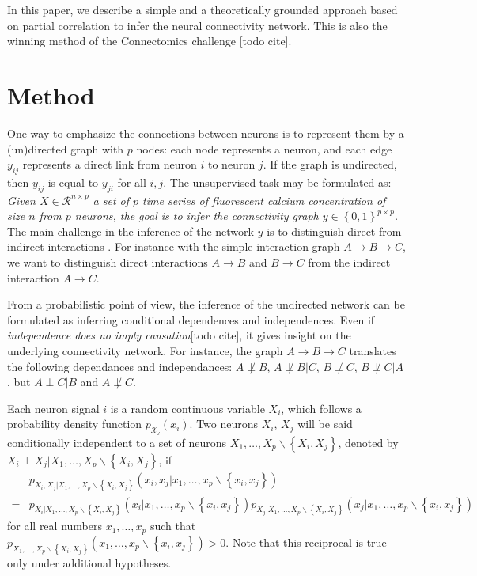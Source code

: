 \documentclass[wcp]{jmlr}
\begin{document}
In this paper, we describe a simple and a theoretically grounded approach
based on partial correlation to infer the neural connectivity network.
This is also the winning method of the Connectomics challenge [todo cite].

\section{Method}

One way to emphasize the connections between neurons is to represent them by a
(un)directed graph with $p$ nodes: each node represents a neuron, and each
edge $y_{ij}$ represents a direct link from neuron  $i$ to neuron $j$. If the
graph is undirected, then $y_{ij}$ is equal to $y_{ji}$  for all $i,j$.
The unsupervised task may be formulated as:
\textit{Given $X \in \mathcal{R}^{n \times p}$  a set of $p$ time series of
fluorescent calcium concentration of size $n$ from $p$ neurons, the goal is to
infer the connectivity graph $y \in \left\{0, 1\right\}^{p \times p}$.}
The main challenge in the inference of the network $y$
is to distinguish direct from indirect interactions \cite{de2004discovery}.
For instance with the simple interaction graph $A \rightarrow B \rightarrow C$,
we want to distinguish direct interactions $A \rightarrow B$ and $B \rightarrow C$
from the indirect interaction $A \rightarrow C$.

From a probabilistic point of view, the inference of the undirected network
can be formulated as inferring conditional dependences and
independences.  Even if \textit{independence
does no imply causation}[todo cite], it gives insight on the underlying connectivity
network. For instance, the graph $A \rightarrow B \rightarrow C$ translates the
following dependances and independances: $A \not\perp B$, $A \not\perp B | C$,
$B \not\perp C$, $B \not\perp C | A$, but $A \perp C | B$ and  $A \not\perp C$.


Each neuron signal $i$ is a random continuous variable $X_i$,
which follows a probability density function $p_\mathcal{X_i}(x_i)$.
Two neurons $X_i$, $X_j$ will be said conditionally independent
to a set of neurons $X_1,\ldots,X_p \backslash \left\{X_i, X_j\right\}$, denoted
by  $X_i \perp X_j | X_1,\ldots,X_p \backslash \left\{X_i, X_j\right\}$,  if
\begin{align*}
&p_{X_i, X_j | X_1,\ldots,X_p \backslash \left\{X_i, X_j\right\}}
    (x_i, x_j | x_1,\ldots,x_p \backslash \left\{x_i, x_j\right\}) \\
=&p_{X_i | X_1,\ldots,X_p \backslash \left\{X_i, X_j\right\}}
    (x_i | x_1,\ldots,x_p \backslash \left\{x_i, x_j\right\})
p_{X_j | X_1,\ldots,X_p \backslash \left\{X_i, X_j\right\}}
    (x_j | x_1,\ldots,x_p \backslash \left\{x_i, x_j\right\})
\end{align*}
for all real numbers $x_1,\ldots,x_p $ such that
$p_{X_1,\ldots,X_p \backslash \left\{X_i, X_j\right\}}
(x_1,\ldots,x_p \backslash \left\{x_i, x_j\right\}) > 0$. Note that this
reciprocal is true only under additional hypotheses.
\end{document}
